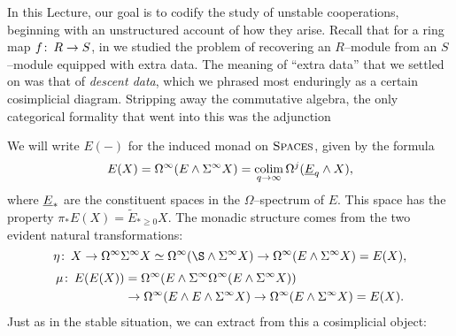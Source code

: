 In this Lecture, our goal is to codify the study of unstable cooperations, beginning with an unstructured account of how they arise.  Recall that for a ring map \(f\colon\thinspace R \to S\), in  we studied the problem of recovering an \(R\)--module from an \(S\)--module equipped with extra data.  The meaning of ``extra data'' that we settled on was that of \textit{descent data}, which we phrased most enduringly as a certain cosimplicial diagram.  Stripping away the commutative algebra, the only categorical formality that went into this was the adjunction
\begin{center}
\end{center}
We will write \(E(-)\) for the induced monad on \(\normalfont\textsc{Spaces}\), given by the formula \[E(X) = \Loops^\infty (E \sm \Susp^\infty X) = \colim_{q \to \infty} \Loops^j (\OS{E}{q} \sm X),\] where \(\OS{E}{*}\) are the constituent spaces in the \(\Omega\)--spectrum of \(E\).  This space has the property \(\pi_* E(X) = \widetilde E_{* \ge 0} X\).  The monadic structure comes from the two evident natural transformations:
\[\eta\co X \to \Loops^\infty \Susp^\infty X \simeq \Loops^\infty (\S \sm \Susp^\infty X) \to \Loops^\infty (E \sm \Susp^\infty X) = E(X),\] \vspace{-1.6\baselineskip}
\begin{align*}
\mu\colon\thinspace E(E(X)) & = \Omega^\infty(E \wedge \Sigma^\infty\Omega^\infty(E \wedge \Sigma^\infty X)) \\
& \to \Omega^\infty(E \wedge E \wedge \Sigma^\infty X) \to \Omega^\infty(E \wedge \Sigma^\infty X) = E(X).
\end{align*}
Just as in the stable situation, we can extract from this a cosimplicial object:

